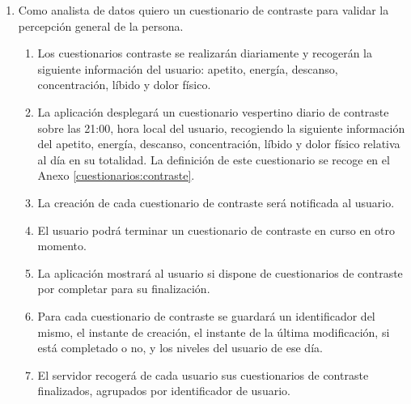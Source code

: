         \begin{enumerate}[resume=req-usuario,label=\textbf{\texttt{RU-\arabic*}}]
            \item \label{req:usuario:analista_contraste} Como analista de datos quiero un cuestionario de contraste para validar la percepción general de la persona.
            \begin{enumerate}[resume=req-funcionales,label=\textbf{\texttt{RF-\arabic*}}]
                \item \label{req:funcionales:contraste_diario_info} Los cuestionarios contraste se realizarán diariamente y recogerán la siguiente información del usuario: apetito, energía, descanso, concentración, líbido y dolor físico. 
                \item \label{req:funcionales:contraste_diario_noche} La aplicación desplegará un cuestionario vespertino diario de contraste sobre las 21:00, hora local del usuario, recogiendo la siguiente información del apetito, energía, descanso, concentración, líbido y dolor físico relativa al día en su totalidad. La definición de este cuestionario se recoge en el Anexo \ref{cuestionarios:contraste}.
                \item \label{req:funcionales:contraste_notificacion} La creación de cada cuestionario de contraste será notificada al usuario.
                \item \label{req:funcionales:contraste_cuestionario_aplazar} El usuario podrá terminar un cuestionario de contraste en curso en otro momento.
                \item \label{req:funcionales:contraste_cuestionario_pendientes} La aplicación mostrará al usuario si dispone de cuestionarios de contraste por completar para su finalización.
                \item \label{req:funcionales:contraste_diario_formato} Para cada cuestionario de contraste se guardará un identificador del mismo, el instante de creación, el instante de la última modificación, si está completado o no, y los niveles del usuario de ese día.
                \item \label{req:funcionales:contraste_finalizado_servidor} El servidor recogerá de cada usuario sus cuestionarios de contraste finalizados, agrupados por identificador de usuario.
            \end{enumerate}
        \end{enumerate}
